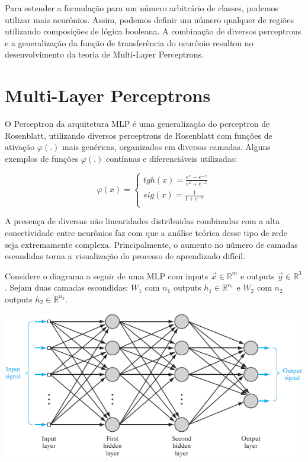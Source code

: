 \documentclass[
	12pt,				%
	oneside,			%
	a4paper,			%
	english,			%
	french,				%
	spanish,			%
	brazil,				%
	]{abntex2}
\begin{document}
Para estender a formula\c{c}\~ao para um n\'umero arbitr\'ario de classes, podemos utilizar mais neur\^onios. Assim, podemos definir um n\'umero qualquer de regi\~oes utilizando composi\c{c}\~oes de l\'ogica booleana. A combinação de diversos perceptrons e a generalização da função de transferência do neurônio resultou no desenvolvimento da teoria de Multi-Layer Perceptrons.

\section{Multi-Layer Perceptrons}
O Perceptron da arquitetura MLP \'e uma generalização do perceptron de Rosenblatt, utilizando diversos perceptrons de Rosenblatt com fun\c{c}\~oes de ativa\c{c}\~ao $\varphi(.)$ mais gen\'ericas, organizados em diversas camadas. Alguns exemplos de fun\c{c}\~oes $\varphi(.)$ cont\'inuas e diferenci\'aveis utilizadas:

$$\varphi(x) = \begin{cases}
tgh(x) = \frac{ e^x - e^{-x} } {e^x + e^{-x}} \\
sig(x) = \frac{ 1 } {1 + e^{-x}} \\

\end{cases} $$

A presen\c{c}a de diversas n\~ao linearidades distribuidas combinadas com a alta conectividade entre neur\^onios faz com que a an\'alise te\'orica desse tipo de rede seja extremamente complexa. Principalmente, o aumento no número de camadas escondidas torna a visualização do processo de aprendizado difícil.

Considere o diagrama a seguir de uma MLP com inputs $\vec{x} \in \mathbb{R}^m$ e outputs $\vec{y} \in \mathbb{R}^3$. Sejam duas camadas escondidas: $W_1$ com $n_1$ outputs $h_1 \in \mathbb{R}^{n_1}$ e $W_2$ com $n_2$ outputs $h_2 \in \mathbb{R}^{n_2}$.

\begin{center}
	\includegraphics[scale=0.8]{MLP.png}
\end{center} 
\end{document}
